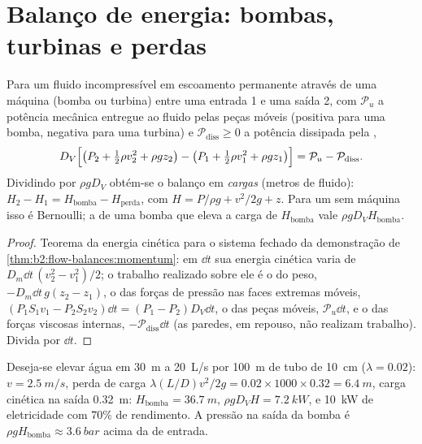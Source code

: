 \section{Balanço de energia: bombas, turbinas e perdas}
\begin{theorem}\label{thm:b2:flow-balances:energy}
Para um fluido incompressível em escoamento permanente através de uma máquina (bomba ou
turbina) entre uma entrada 1 e uma saída 2, com $\mathcal P_u$ a
potência mecânica entregue ao fluido pelas peças móveis (positiva para uma
bomba, negativa para uma turbina) e $\mathcal P_{\text{diss}} \ge 0$ a potência
dissipada pela ,
\[
D_V\Bigl[\bigl(P_2 + \tfrac12\rho v_2^2 + \rho gz_2\bigr) - \bigl(P_1 + \tfrac12\rho v_1^2
+ \rho gz_1\bigr)\Bigr] = \mathcal P_u - \mathcal P_{\text{diss}} .
\]
Dividindo por $\rho gD_V$ obtém-se o balanço em \emph{cargas} (metros de
fluido): $H_2 - H_1 = H_{\text{bomba}} - H_{\text{perda}}$, com $H = P/\rho g +
v^2/2g + z$. Para um  sem máquina isso é Bernoulli; a
\emph{} de uma bomba que eleva a carga de $H_{\text{bomba}}$ vale
$\rho gD_VH_{\text{bomba}}$.
\end{theorem}

\begin{proof}
Teorema da energia cinética para o sistema fechado da demonstração de
\cref{thm:b2:flow-balances:momentum}: em $\dd t$ sua energia cinética
varia de $D_m\dd t\,(v_2^2 - v_1^2)/2$; o trabalho realizado sobre ele é o do
peso, $-D_m\dd t\,g(z_2 - z_1)$, o das forças de pressão nas faces
extremas móveis, $(P_1S_1v_1 - P_2S_2v_2)\dd t = (P_1 - P_2)D_V\dd t$, o das
peças móveis, $\mathcal P_u\dd t$, e o das forças viscosas internas,
$-\mathcal P_{\text{diss}}\dd t$ (as paredes, em repouso, não realizam trabalho). Divida por
$\dd t$.
\end{proof}

\begin{example}\label{ex:b2:flow-balances:pump}
Deseja-se elevar água em \qty{30}{m} a \qty{20}{L/s} por \qty{100}{m} de
tubo de \qty{10}{cm} ($\lambda = 0.02$): $v = \qty{2.5}{m/s}$, perda de carga $\lambda(L/D)
v^2/2g = 0.02 \times 1000 \times 0.32 = \qty{6.4}{m}$, carga cinética na saída
\qty{0.32}{m}: $H_{\text{bomba}} = \qty{36.7}{m}$,  $\rho gD_VH =
\qty{7.2}{kW}$, e \qty{10}{kW} de eletricidade com $70\%$ de rendimento. A
pressão na saída da bomba é $\rho gH_{\text{bomba}} \approx \qty{3.6}{bar}$ acima
da de entrada.
\end{example}

